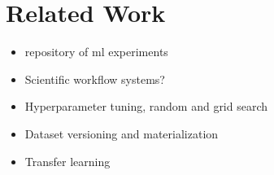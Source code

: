 \section{Related Work} \label{sec-related-work}
\begin{itemize}
\item repository of ml experiments
% 
\item Scientific workflow systems?
\item Hyperparameter tuning, random and grid search
\item Dataset versioning and materialization \cite{bhattacherjee2015principles, vartak2018mistique}
\item Transfer learning
\end{itemize}


